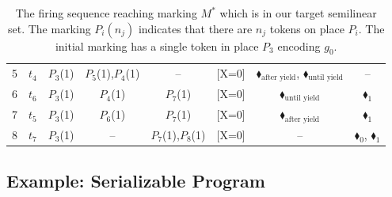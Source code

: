 \begin{table}[!htbp]
{\begin{tabular}{c l c c c c c c}
		5 & $t_4$                                  
		& {\color{blue}$P_3$(1)}                  
		& $P_5$(1),$P_4$(1)                          
		& --                                    
		&                                   {\color{blue}[X=0]}     
		&                                    {\color{black}$\blacklozenge_\text{after yield}$}, {\color{black}$\blacklozenge_\text{until yield}$}   
		& --                                    \\
		6 & $t_6$                     
		& {\color{blue}$P_3$(1)}                  
		& $P_4$(1)                                
		& {\color{red}$P_7$(1)}                    
		&                                      	{\color{blue}[X=0]}  
		&                                    {\color{black}$\blacklozenge_\text{until yield}$}   
		&                                   {\color{red}$\blacklozenge_1$}     \\
		7 & $t_5$                                  
		& {\color{blue}$P_3$(1)}                  
		& $P_6$(1)                                
		& {\color{red}$P_7$(1)}                    
		&                                   {\color{blue}[X=0]}    
		&                                    {\color{black}$\blacklozenge_\text{after yield}$}      
		&                                   {\color{red}$\blacklozenge_1$}        \\
		8 & $t_7$                     
		& {\color{blue}$P_3$(1)}                                  
		& --                                    
		& {\color{red}$P_7$(1),\color{red}$P_8$(1)}    
		&                                   {\color{blue}[X=0]}    
		&                                   --    
		&                                   {\color{red}$\blacklozenge_0$}, {\color{red}$\blacklozenge_1$}       \\
		\bottomrule
	\end{tabular}
	}
	\caption{The firing sequence reaching marking $M^*$ which is in our target semilinear set. The marking $P_i(n_j)$ indicates that there are $n_j$ tokens on place $P_i$. The initial marking has a single token in place $P_3$ encoding $g_0$.}
	\label{tab:PetriNetFiringCounterexample}
\end{table}


\subsection{Example: Serializable Program}
\label{subsec:ns-serializable}

